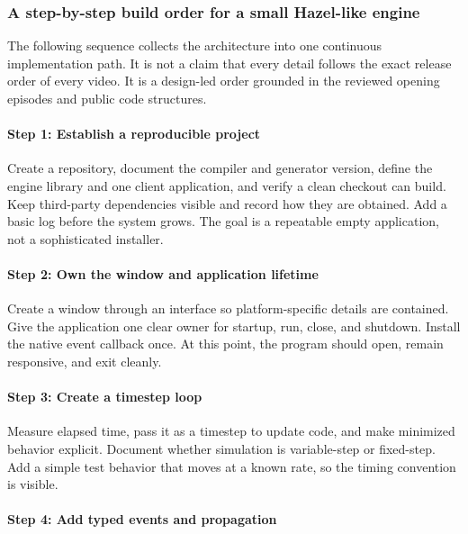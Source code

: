 \subsubsection{A step-by-step build order for a small Hazel-like engine}\label{a-step-by-step-build-order-for-a-small-hazel-like-engine}

The following sequence collects the architecture into one continuous implementation path. It is not a claim that every detail follows the exact release order of every video. It is a design-led order grounded in the reviewed opening episodes and public code structures.

\paragraph{Step 1: Establish a reproducible project}\label{step-1-establish-a-reproducible-project}

Create a repository, document the compiler and generator version, define the engine library and one client application, and verify a clean checkout can build. Keep third-party dependencies visible and record how they are obtained. Add a basic log before the system grows. The goal is a repeatable empty application, not a sophisticated installer.

\paragraph{Step 2: Own the window and application lifetime}\label{step-2-own-the-window-and-application-lifetime}

Create a window through an interface so platform-specific details are contained. Give the application one clear owner for startup, run, close, and shutdown. Install the native event callback once. At this point, the program should open, remain responsive, and exit cleanly.

\paragraph{Step 3: Create a timestep loop}\label{step-3-create-a-timestep-loop}

Measure elapsed time, pass it as a timestep to update code, and make minimized behavior explicit. Document whether simulation is variable-step or fixed-step. Add a simple test behavior that moves at a known rate, so the timing convention is visible.

\paragraph{Step 4: Add typed events and propagation}\label{step-4-add-typed-events-and-propagation}

